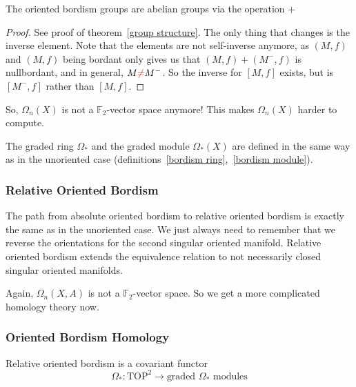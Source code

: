 \documentclass[a4paper,11pt]{article}
\begin{document}
\begin{theorem}
    The oriented bordism groups are abelian groups via the operation \(+\)
\end{theorem}

\begin{proof}
    See proof of theorem\ \ref{group structure}. The only thing that changes is the inverse element. Note that the elements are not self-inverse anymore, as \((M,f)\) and \((M,f)\) being bordant only gives us that \((M,f)+(M^-,f)\) is nullbordant, and in general, \(M\textcolor{red}{\neq} M^-\). So the inverse for \([M,f]\) exists, but is \([M^-,f]\) rather than \([M,f]\).
\end{proof}

So, \(\Omega_n(X)\) is not a \(\mathbb{F}_2\)-vector space anymore! This makes \(\Omega_n(X)\) harder to compute.

The graded ring \(\Omega_\ast\) and the graded module \(\Omega_\ast(X)\) are defined in the same way as in the unoriented case (definitions\ \ref{bordism ring},\ \ref{bordism module}).


\subsubsection{Relative Oriented Bordism}

The path from absolute oriented bordism to relative oriented bordism is exactly the same as in the unoriented case. We just always need to remember that we reverse the orientations for the second singular oriented manifold. Relative oriented bordism extends the equivalence relation to not necessarily closed singular oriented manifolds.

Again, \(\Omega_n(X,A)\) is not a \(\mathbb{F}_2\)-vector space. So we get a more complicated homology theory now.

\subsubsection{Oriented Bordism Homology}

\begin{lemma}
    Relative oriented bordism is a covariant functor
    \[\Omega_\ast:\mathrm{TOP}^2\to\text{graded }\Omega_\ast\text{ modules}\]
\end{lemma}
\end{document}
